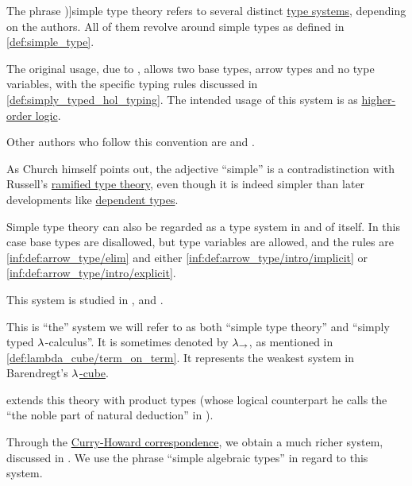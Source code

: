 \begin{concept}\label{con:simple_type_theory}
  The phrase \term[en=simple type theory (\cite[ix]{Hindley1997BasicSTT})]{simple type theory} refers to several distinct \hyperref[def:abstract_type_system]{type systems}, depending on the authors. All of them revolve around simple types as defined in \cref{def:simple_type}.

  \begin{thmenum}
     The original usage, due to , allows two base types, arrow types and no type variables, with the specific typing rules discussed in \cref{def:simply_typed_hol_typing}. The intended usage of this system is as \hyperref[rem:predicate_logic]{higher-order logic}.

    Other authors who follow this convention are  and .

    As Church himself points out, the adjective \enquote{simple} is a contradistinction with Russell's \hyperref[con:ramified_type_theory]{ramified type theory}, even though it is indeed simpler than later developments like \hyperref[con:dependent_type]{dependent types}.

     Simple type theory can also be regarded as a type system in and of itself. In this case base types are disallowed, but type variables are allowed, and the rules are \ref{inf:def:arrow_type/elim} and either \ref{inf:def:arrow_type/intro/implicit} or \ref{inf:def:arrow_type/intro/explicit}.

    This system is studied in ,  and .

    This is \enquote{the} system we will refer to as both \enquote{simple type theory} and \enquote{simply typed \( {\mathrm \lambda} \)-calculus}. It is sometimes denoted by \( {\mathrm \lambda}_{\rightarrow} \), as mentioned in \cref{def:lambda_cube/term_on_term}. It represents the weakest system in Barendregt's \hyperref[def:lambda_cube]{\( {\mathrm \lambda} \)-cube}.

     extends this theory with product types (whose logical counterpart he calls the \enquote{the noble part of natural deduction} in \cite[\S 5.3]{GirardEtAl1989ProofsAndTypes}).

     Through the \hyperref[con:curry_howard_correspondence]{Curry-Howard correspondence}, we obtain a much richer system, discussed in . We use the phrase \enquote{simple algebraic types} in regard to this system.


\end{thmenum}
\end{concept}
